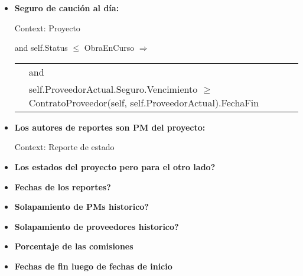 \begin{itemize}
	\item \textbf{Seguro de caución al día:}
	
			Context: Proyecto
			
			 and self.Status $\leq$ ObraEnCurso $\Rightarrow$
			
			\begin{tabular}{ll}
				\hfill
				& \notEmpty{self.ProveedorActual.Seguro} and	\\
				& self.ProveedorActual.Seguro.Vencimiento $\geq$ ContratoProveedor(self, self.ProveedorActual).FechaFin	\\
			\end{tabular}
				
	\item \textbf{Los autores de reportes son PM del proyecto:}
		
			Context: Reporte de estado 
			
	
	\item \textbf{Los estados del proyecto pero para el otro lado?}
	\item \textbf{Fechas de los reportes?}
	\item \textbf{Solapamiento de PMs historico?}
	\item \textbf{Solapamiento de proveedores historico?}
	\item \textbf{Porcentaje de las comisiones}
	\item \textbf{Fechas de fin luego de fechas de inicio}
	
\end{itemize}

